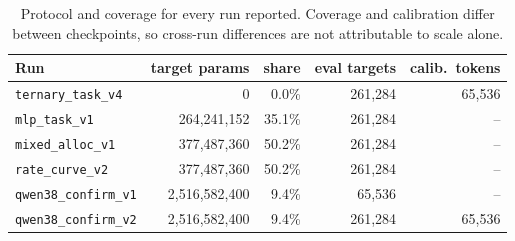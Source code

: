 \begin{table}[t]
\centering
\small
\begin{tabular}{lrrrr}
\toprule
Run & target params & share & eval targets & calib.\ tokens \\
\midrule
\texttt{ternary\_task\_v4} & 0 & 0.0\% & 261,284 & 65,536 \\
\texttt{mlp\_task\_v1} & 264,241,152 & 35.1\% & 261,284 & -- \\
\texttt{mixed\_alloc\_v1} & 377,487,360 & 50.2\% & 261,284 & -- \\
\texttt{rate\_curve\_v2} & 377,487,360 & 50.2\% & 261,284 & -- \\
\texttt{qwen38\_confirm\_v1} & 2,516,582,400 & 9.4\% & 65,536 & -- \\
\texttt{qwen38\_confirm\_v2} & 2,516,582,400 & 9.4\% & 261,284 & 65,536 \\
\bottomrule
\end{tabular}
\caption{Protocol and coverage for every run reported. Coverage and calibration differ between checkpoints, so cross-run differences are not attributable to scale alone.}
\label{tab:coverage}
\end{table}
